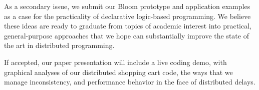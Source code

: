 As a secondary issue, we submit our Bloom prototype and application examples as a case for the practicality of declarative logic-based programming.  We believe these ideas are ready to graduate from topics of academic interest into practical, general-purpose approaches that we hope can substantially improve the state of the art in distributed programming.

If accepted, our paper presentation will include a live coding demo, with graphical analyses of our distributed shopping cart code, the ways that we manage inconsistency, and performance behavior in the face of distributed delays.
